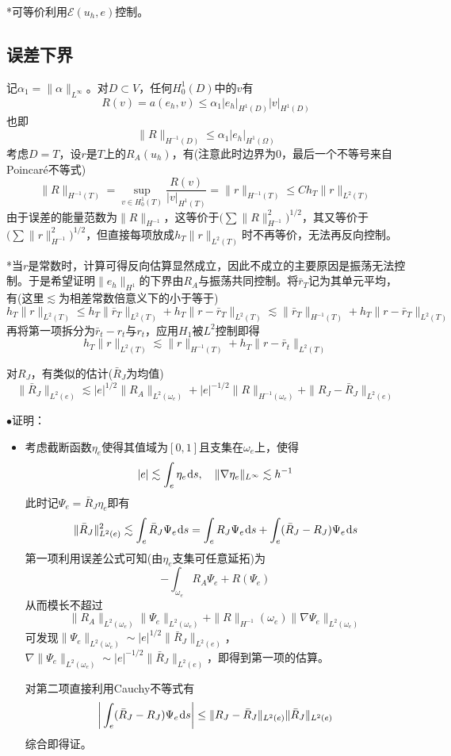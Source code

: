 \documentclass[a4paper,UTF8,fontset=windows]{ctexart}
\newcommand*{\dr}{\hspace{0.07em}\mathrm{d}}
\newcommand*{\ce}{\mathcal{E}}
\newcommand{\proo}[1]{{\kaishu $\bullet$证明：
\begin{itemize}
    \item[] #1
\end{itemize}
}}
\begin{document}
*可等价利用$\ce(u_h,e)$控制。

\subsection{误差下界}
记$\alpha_1=\|\alpha\|_{L^\infty}$。对$D\subset V$，任何$H_0^1(D)$中的$v$有
$$R(v)=a(e_h,v)\le\alpha_1|e_h|_{H^1(D)}|v|_{H^1(D)}$$
也即
$$\|R\|_{H^{-1}(D)}\le\alpha_1|e_h|_{H^1(\Omega)}$$
考虑$D=T$，设$r$是$T$上的$R_A(u_h)$，有(注意此时边界为0，最后一个不等号来自Poincar\'e不等式)
$$\|R\|_{H^{-1}(T)}=\sup_{v\in H_0^1(T)}\frac{R(v)}{|v|_{H^1(T)}}=\|r\|_{H^{-1}(T)}\le Ch_T\|r\|_{L^2(T)}$$
由于误差的能量范数为$\|R\|_{H^{-1}}$，这等价于$\big(\sum\|R\|_{H^{-1}}^2\big)^{1/2}$，其又等价于$\big(\sum\|r\|_{H^{-1}}^2\big)^{1/2}$，但直接每项放成$h_T\|r\|_{L^2(T)}$时不再等价，无法再反向控制。

*当$r$是常数时，计算可得反向估算显然成立，因此不成立的主要原因是振荡无法控制。于是希望证明$\|e_h\|_{H^1}$的下界由$R_A$与振荡共同控制。将$\bar{r}_T$记为其单元平均，有(这里$\lesssim$为相差常数倍意义下的小于等于)
$$h_T\|r\|_{L^2(T)}\le h_T\|\bar{r}_T\|_{L^2(T)}+h_T\|r-\bar{r}_T\|_{L^2(T)}\lesssim \|\bar{r}_T\|_{H^{-1}(T)}+h_T\|r-\bar{r}_T\|_{L^2(T)}$$
再将第一项拆分为$\bar{r}_t-r_t$与$r_t$，应用$H_1$被$L^2$控制即得
$$h_T\|r\|_{L^2(T)}\lesssim\|r\|_{H^{-1}(T)}+h_T\|r-\bar{r}_t\|_{L^2(T)}$$

对$R_J$，有类似的估计($\bar{R}_J$为均值)
$$\|\bar{R}_J\|_{L^2(e)}\lesssim|e|^{1/2}\|R_A\|_{L^2(\omega_e)}+|e|^{-1/2}\|R\|_{H^{-1}(\omega_e)}+\|R_J-\bar{R}_J\|_{L^2(e)}$$

\proo{
    考虑截断函数$\eta_e$使得其值域为$[0,1]$且支集在$\omega_e$上，使得
    $$|e|\lesssim\int_e\eta_e\dr s,\quad\|\nabla\eta_e\|_{L^\infty}\lesssim h^{-1}$$
    此时记$\Psi_e=\bar{R}_J\eta_e$即有
    $$\|\bar{R}_J\|_{L^2(e)}^2\lesssim\int_e\bar{R}_J\Psi_e\dr s=\int_eR_J\Psi_e\dr s+\int_e(\bar{R}_J-R_J)\Psi_e\dr s$$
    第一项利用误差公式可知(由$\eta_e$支集可任意延拓)为
    $$-\int_{\omega_e}R_A\Psi_e+R(\Psi_e)$$
    从而模长不超过
    $$\|R_A\|_{L^2(\omega_e)}\|\Psi_e\|_{L^2(\omega_e)}+\|R\|_{H^{-1}}(\omega_e)\|\nabla\Psi_e\|_{L^2(\omega_e)}$$
    可发现$\|\Psi_e\|_{L^2(\omega_e)}\sim|e|^{1/2}\|\bar{R}_J\|_{L^2(e)}$，$\nabla\|\Psi_e\|_{L^2(\omega_e)}\sim|e|^{-1/2}\|\bar{R}_J\|_{L^2(e)}$，即得到第一项的估算。

    对第二项直接利用Cauchy不等式有
    $$\bigg|\int_e(\bar{R}_J-R_J)\Psi_e\dr s\bigg|\le\|R_J-\bar{R}_J\|_{L^2(e)}\|\bar{R}_J\|_{L^2(e)}$$
    综合即得证。

}
\end{document}

